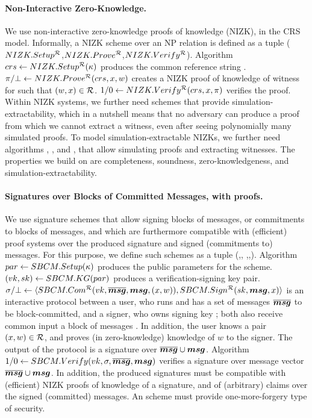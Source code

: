\paragraph{Non-Interactive Zero-Knowledge.} %
We use non-interactive zero-knowledge proofs of knowledge (NIZK), in the CRS
model. Informally, a NIZK scheme over an NP relation \NIZKRel is defined as a
tuple ($NIZK.Setup^{\mathcal{R}}$,$NIZK.Prove^{\mathcal{R}}$,$NIZK.Verify^\mathcal{R}$).
Algorithm $crs \gets NIZK.Setup^{\mathcal{R}}(\kappa)$ produces the common
reference string \NIZKcrs. $\pi/\bot \gets NIZK.Prove^{\mathcal{R}}(crs,
x,w)$ creates a NIZK proof of knowledge of witness \NIZKw for \NIZKx
such that $(w,x) \in \mathcal{R}$. $1/0 \gets NIZK.Verify^{\mathcal{R}}
(crs,x,\pi)$ verifies the proof. Within NIZK systems, we
further need schemes that provide simulation-extractability, which in a nutshell
means that no adversary can produce a proof from which we cannot extract a
witness, even after seeing polynomially many simulated proofs. To model
simulation-extractable NIZKs, we further need algorithms \NIZKSimSetup,
\NIZKSim, and \NIZKExtract, that allow simulating proofs and extracting
witnesses. The properties we build on are completeness, soundness,
zero-knowledgeness, and simulation-extractability.

\paragraph{Signatures over Blocks of Committed Messages, with proofs.} %
We use signature schemes that allow signing blocks of messages, or commitments
to blocks of messages, and which are furthermore compatible with (efficient)
proof systems over the produced signature and signed (commitments to) messages.
For this purpose, we define such schemes as a tuple (\SBCMSetup,\SBCMKeyGen,
\SBCMCom,\SBCMSign,\SBCMVerify). Algorithm $par \gets SBCM.Setup(\kappa)$
produces the public parameters for the scheme. %
$(vk,sk) \gets SBCM.KG(par)$ produces a verification-signing
key pair. $\sigma/\bot \gets\langle SBCM.Com^{\mathcal{R}}(vk,\overline{\boldsymbol{msg}},
\boldsymbol{msg},(x,w)),SBCM.Sign^\mathcal{R}(sk,\boldsymbol{msg},x) \rangle$ is an interactive protocol
between a user, who runs \SBCMCom and has a set of messages $\overline{\boldsymbol{msg}}$
to be block-committed, and a signer, who owns signing key \sk; both also receive
common input a block of messages \smsg. In addition, the user knows a pair
$(x,w) \in \mathcal{R}$, and proves (in zero-knowledge) knowledge of $w$ to the
signer. The output of the protocol is a signature over
$\overline{\boldsymbol{msg}} \cup \boldsymbol{msg}$. Algorithm $1/0 \gets SBCM.Verify(vk,
\sigma,\overline{\boldsymbol{msg}},\boldsymbol{msg})$ verifies a signature \sig over message vector
$\overline{\boldsymbol{msg}} \cup \boldsymbol{msg}$. In addition, the
produced signatures must be compatible with (efficient) NIZK proofs of knowledge
of a signature, and of (arbitrary) claims over the signed (committed) messages.
An \SBCM scheme must provide one-more-forgery type of security.

